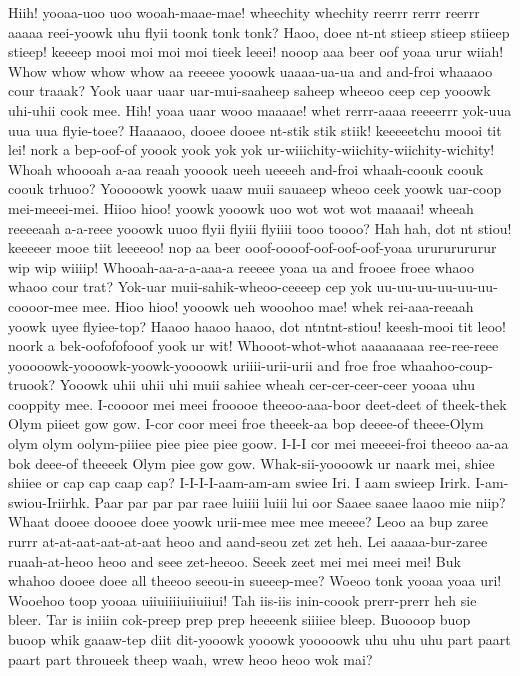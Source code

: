\documentclass[12pt,a4paper]{article}
\begin{document}
\begin{drama}
\pistspeaks
Hiih! yooaa-uoo uoo wooah-maae-mae! wheechity whechity reerrr rerrr reerrr aaaaa reei-yoowk uhu flyii toonk tonk tonk? Haoo, doee nt-nt stieep stieep stiieep stieep! keeeep mooi moi moi moi tieek leeei! nooop aaa beer oof yoaa urur wiiah! Whow whow whow whow aa reeeee yooowk uaaaa-ua-ua and and-froi whaaaoo cour traaak? Yook uaar uaar uar-mui-saaheep saheep wheeoo ceep cep yooowk uhi-uhii cook mee. Hih! yoaa uaar wooo maaaae! whet rerrr-aaaa reeeerrr yok-uua uua uua flyie-toee? Haaaaoo, dooee dooee nt-stik stik stiik! keeeeetchu moooi tit lei! nork a bep-oof-of yoook yook yok yok ur-wiiichity-wiichity-wiichity-wichity! Whoah whoooah a-aa reaah yooook ueeh ueeeeh and-froi whaah-coouk coouk coouk trhuoo? Yooooowk yoowk uaaw muii sauaeep wheoo ceek yoowk uar-coop mei-meeei-mei. Hiioo hioo! yoowk yooowk uoo wot wot wot maaaai! wheeah reeeeaah a-a-reee yooowk uuoo flyii flyiii flyiiii tooo toooo? Hah hah, dot nt stiou! keeeeer mooe tiit leeeeoo! nop aa beer ooof-oooof-oof-oof-oof-yoaa urururururur wip wip wiiiip! Whooah-aa-a-a-aaa-a reeeee yoaa ua and frooee froee whaoo whaoo cour trat? Yok-uar muii-sahik-wheoo-ceeeep cep yok uu-uu-uu-uu-uu-uu-coooor-mee mee. Hioo hioo! yooowk ueh wooohoo mae! whek rei-aaa-reeaah yoowk uyee flyiee-top? Haaoo haaoo haaoo, dot ntntnt-stiou! keesh-mooi tit leoo! noork a bek-oofofofooof yook ur wit! Whooot-whot-whot aaaaaaaaa ree-ree-reee yooooowk-yoooowk-yoowk-yoooowk uriiii-urii-urii and froe froe whaahoo-coup-truook? Yooowk uhii uhii uhi muii sahiee wheah cer-cer-ceer-ceer yooaa uhu cooppity mee.
\irisspeaks
I-coooor mei meei frooooe theeoo-aaa-boor deet-deet of theek-thek Olym piieet gow gow. I-cor coor meei froe theeek-aa bop deeee-of theee-Olym olym olym oolym-piiiee piee piee piee goow. I-I-I cor mei meeeei-froi theeoo aa-aa bok deee-of theeeek Olym piee gow gow.
\pistspeaks
Whak-sii-yoooowk ur naark mei, shiee shiiee or cap cap caap cap?
\irisspeaks
I-I-I-I-aam-am-am swiee Iri. I aam swieep Irirk. I-am-swiou-Iriirhk.
\pistspeaks
Paar par par par raee luiiii luiii lui oor Saaee saaee laaoo mie niip?
\irisspeaks
Whaat dooee doooee doee yoowk urii-mee mee mee meeee?
\pistspeaks
Leoo aa bup zaree rurrr at-at-aat-aat-at-aat heoo and aand-seou zet zet heh. Lei aaaaa-bur-zaree ruaah-at-heoo heoo and seee zet-heeoo.
\irisspeaks
Seeek zeet mei mei meei mei! Buk whahoo dooee doee all theeoo seeou-in sueeep-mee?
\pistspeaks
Woeoo tonk yooaa yoaa uri! Wooehoo toop yooaa uiiuiiiiuiiuiiui!
\irisspeaks
Tah iis-iis inin-coook prerr-prerr heh sie bleer. Tar is iniiin cok-preep prep prep heeeenk siiiiee bleep.
\pistspeaks
Buoooop buop buoop whik gaaaw-tep diit dit-yooowk yooowk yooooowk uhu uhu uhu part paart paart part throueek theep waah, wrew heoo heoo wok mai?

\end{drama}
\end{document}
